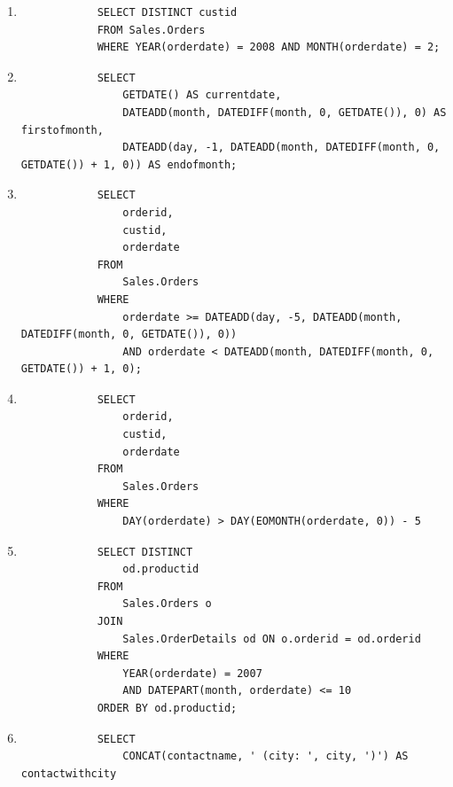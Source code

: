 \documentclass[12pt,titlepage]{article}
\begin{document}
\begin{enumerate}
{    }
    \item {
        \begin{verbatim}
            SELECT DISTINCT custid
            FROM Sales.Orders
            WHERE YEAR(orderdate) = 2008 AND MONTH(orderdate) = 2;
        \end{verbatim}
    }
    \item {
        \begin{verbatim}
            SELECT 
                GETDATE() AS currentdate,
                DATEADD(month, DATEDIFF(month, 0, GETDATE()), 0) AS firstofmonth,
                DATEADD(day, -1, DATEADD(month, DATEDIFF(month, 0, GETDATE()) + 1, 0)) AS endofmonth;
        \end{verbatim}
    }
    \pagebreak
    \item {
        \begin{verbatim}
            SELECT
                orderid,
                custid,
                orderdate
            FROM 
                Sales.Orders
            WHERE
                orderdate >= DATEADD(day, -5, DATEADD(month, DATEDIFF(month, 0, GETDATE()), 0))
                AND orderdate < DATEADD(month, DATEDIFF(month, 0, GETDATE()) + 1, 0);
        \end{verbatim}
    }
    \item {
        \begin{verbatim}
            SELECT
                orderid,
                custid,
                orderdate
            FROM 
                Sales.Orders
            WHERE
                DAY(orderdate) > DAY(EOMONTH(orderdate, 0)) - 5
        \end{verbatim}
    }
    \item {
        \begin{verbatim}
            SELECT DISTINCT
                od.productid
            FROM
                Sales.Orders o
            JOIN
                Sales.OrderDetails od ON o.orderid = od.orderid
            WHERE
                YEAR(orderdate) = 2007
                AND DATEPART(month, orderdate) <= 10
            ORDER BY od.productid;
        \end{verbatim}
    }
    \item {
        \begin{verbatim}
            SELECT
                CONCAT(contactname, ' (city: ', city, ')') AS contactwithcity

\end{verbatim}}
\end{enumerate}
\end{document}
